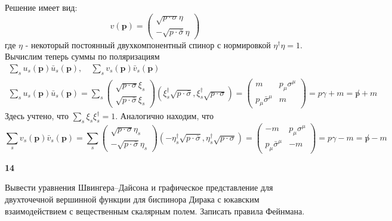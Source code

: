 \documentclass[a4paper,12pt]{article} %
\begin{document}
\begin{ttask}
Решение имеет вид:
$$
v(\mathbf{p})=\left(\begin{array}{c}
	\sqrt{p \cdot \sigma} \eta \\
	-\sqrt{p \cdot \bar{\sigma}} \eta
\end{array}\right)
$$
где $\eta$ - некоторый постоянный двухкомпонентный спинор с нормировкой $\eta^{\dagger} \eta=1 .$
Вычислим теперь суммы по поляризациям
$$
\begin{array}{c}
	\sum_{s} u_{s}(\mathbf{p}) \bar{u}_{s}(\mathbf{p}), \quad \sum_{s} v_{s}(\mathbf{p}) \bar{v}_{s}(\mathbf{p}) \\
	\sum_{s} u_{s}(\mathbf{p}) \bar{u}_{s}(\mathbf{p})=\sum_{s}\left(\begin{array}{c}
		\sqrt{p \cdot \sigma} \xi_{s} \\
		\sqrt{p \cdot \bar{\sigma}} \xi_{s}
	\end{array}\right)\left(\xi_{s}^{\dagger} \sqrt{p \cdot \bar{\sigma}}, \xi_{s}^{\dagger} \sqrt{p \cdot \sigma}\right)=\left(\begin{array}{cc}
		m & p_{\mu} \sigma^{\mu} \\
		p_{\mu} \bar{\sigma}^{\mu} & m
	\end{array}\right)=p \gamma+m=\not p+m
\end{array}
$$
Здесь учтено, что $\sum_{s} \xi_{s} \xi_{s}^{\dagger}=1.$  Аналогично находим, что
$$
\sum_{s} v_{s}(\mathbf{p}) \bar{v}_{s}(\mathbf{p})=\sum_{s}\left(\begin{array}{c}
	\sqrt{p \cdot \sigma} \eta_{s} \\
	-\sqrt{p \cdot \bar{\sigma}} \eta_{s}
\end{array}\right)\left(-\eta_{s}^{\dagger} \sqrt{p \cdot \bar{\sigma}}, \eta_{s}^{\dagger} \sqrt{p \cdot \sigma}\right)=\left(\begin{array}{cc}
	-m & p_{\mu} \sigma^{\mu} \\
	p_{\mu} \bar{\sigma}^{\mu} & -m
\end{array}\right)=p \gamma-m=\not p-m
$$













\end{ttask}






\begin{ttask}\textbf{14} 

Вывести уравнения Швингера–Дайсона и графическое представление для двухточечной вершинной функции для биспинора Дирака 
с юкавским взаимодействием с вещественным скалярным полем. 
Записать правила Фейнмана.

















\end{ttask}
\end{document}
